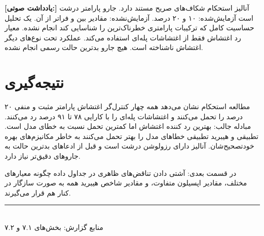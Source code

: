 \documentclass[12pt, a4paper]{article}
\newcommand{\dash}{\lr{---}}
\begin{document}

\begin{mdframed}[
  backgroundcolor=audiotan,
  linecolor=audionote!70,
  linewidth=1pt,
  innerleftmargin=12pt,
  innerrightmargin=12pt,
  innertopmargin=8pt,
  innerbottommargin=8pt
]
\textbf{\color{audionote}[يادداشت صوتی:]}
آناليز استحکام شکاف‌های صريح مستند دارد. جارو پارامتر درشت است \dash{} آزمايش‌شده: ۱۰ و ۲۰ درصد. آزمايش‌نشده: مقادير بين و فراتر از آن. يک تحليل حساسيت کامل که ترکيبات پارامتری خطرناک‌ترين را شناسايی کند انجام نشده. معيار رد اغتشاش فقط از اغتشاشات پله‌ای استفاده می‌کند. عملکرد تحت نوع‌های ديگر اغتشاش ناشناخته است. هيچ جارو بدترین حالت رسمی انجام نشده.
\end{mdframed}

\vspace{0.6cm}

\section{نتيجه‌گيری}

مطالعه استحکام نشان می‌دهد همه چهار کنترل‌گر اغتشاش پارامتر مثبت و منفی ۲۰ درصد را تحمل می‌کنند و اغتشاشات پله‌ای را با کارايی ۷۸ تا ۹۱ درصد رد می‌کنند. مبادله جالب:  بهترين رد کننده اغتشاش اما کمترين تحمل نسبت به خطای مدل است. تطبيقی و هيبريد تطبيقی خطاهای مدل را بهتر تحمل می‌کنند به خاطر مکانيزم‌های بهره خودتصحيح‌شان. آناليز دارای رزولوشن درشت است و قبل از ادعاهای بدترين حالت به جاروهای دقيق‌تر نياز دارد.

در قسمت بعدی: آشتی دادن تناقض‌های ظاهری در جداول داده \dash{} چگونه معيارهای مختلف، مقادير اپسيلون متفاوت، و مقادير شاخص هيبريد همه به صورت سازگار در کنار هم قرار می‌گيرند.

\vspace{1.5cm}
\begin{center}
{\color{seriesblue}\rule{0.45\linewidth}{0.4pt}}\\[8pt]
{\small\color{sectiongray}
منابع گزارش: بخش‌های ۷.۱ و ۷.۲
}
\end{center}
\end{document}
